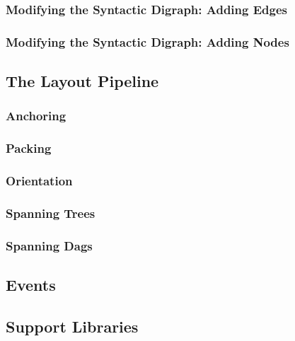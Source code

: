 \subsubsection{Modifying the Syntactic Digraph: Adding Edges}

\subsubsection{Modifying the Syntactic Digraph: Adding Nodes}



\subsection{The Layout Pipeline}

\label{section-gd-layout-pipeline}

\subsubsection{Anchoring}

\subsubsection{Packing}

\subsubsection{Orientation}

\subsubsection{Spanning Trees}

\subsubsection{Spanning Dags}


\subsection{Events}

\label{section-gd-events}

\subsection{Support Libraries}

\label{section-gd-libs}

